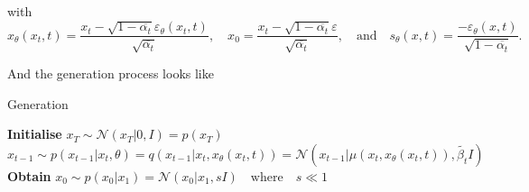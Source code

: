 with
\begin{equation*}
    x_\theta (x_t, t) = \frac{x_t - \sqrt{1 - \overline{\alpha_t}} \varepsilon_\theta(x_t, t)}{\sqrt{\overline{\alpha_t}}}, \quad x_0 = \frac{x_t - \sqrt{1 - \overline{\alpha_t}} \varepsilon}{\sqrt{\overline{\alpha_t}}}, \quad \text{and} \quad s_\theta(x, t) = \frac{- \varepsilon_\theta(x, t)}{\sqrt{1 - \overline{\alpha_t}}}.
\end{equation*}

And the generation process looks like 
\begin{algorithm}
    \caption{Generation}
    \begin{algorithmic}
        \State \textbf{Initialise} $x_T \sim \mathcal{N}(x_T | 0, I) = p(x_T)$ 
            \State $x_{t - 1} \sim p(x_{t - 1} | x_t, \theta) = q(x_{t - 1} | x_t, x_\theta(x_t, t)) = \mathcal{N}(x_{t - 1} | \mu(x_t, x_\theta(x_t, t)), \widetilde{\beta_{t}} I)$
        \EndFor
        \State \textbf{Obtain} $x_0 \sim p(x_0 | x_1) = \mathcal{N}(x_0 | x_1, s I) \quad \text{where} \quad s \ll 1$
    \end{algorithmic}
\end{algorithm}

